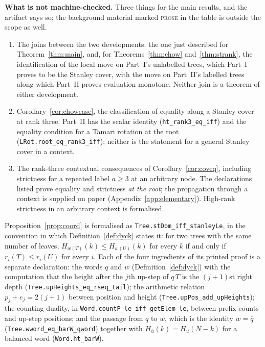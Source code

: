 \documentclass[11pt,a4paper]{article}
\theoremstyle{plain}
\theoremstyle{definition}
\begin{document}
\textbf{What is not machine-checked.}  Three things for the main results, and the
artifact says so; the background material marked \textsc{prose} in the table is outside
the scope as well.
\begin{enumerate}\itemsep2pt
\item The joins between the two developments: the one just described for
      Theorem~\ref{thm:main}, and, for Theorems~\ref{thm:chow} and~\ref{thm:strank},
      the identification of the local move on Part~I's unlabelled trees, which Part~I
      proves to be the Stanley cover, with the move on Part~II's labelled trees along
      which Part~II proves evaluation monotone.  Neither join is a theorem of either
      development.
\item Corollary~\ref{cor:chowcase}, the classification of equality along a Stanley cover
      at rank three.  Part~II has the scalar identity (\verb|ht_rank3_eq_iff|) and the
      equality condition for a Tamari rotation at the root
      (\verb|LRot.root_eq_rank3_iff|); neither is the statement for a general Stanley
      cover in a context.
\item The rank-three contextual consequences of Corollary~\ref{cor:coveq}, including
      strictness for a repeated label $a\ge3$ at an arbitrary node.  The declarations
      listed prove equality and strictness \emph{at the root}; the propagation through a
      context is supplied on paper (Appendix~\ref{app:elementary}).  High-rank
      strictness in an arbitrary context is formalised.
\end{enumerate}


\begin{sloppypar}
Proposition~\ref{prop:coord} is formalised as
\verb|Tree.stDom_iff_stanleyLe|, in the convention in which
Definition~\ref{def:dyck} states it: for two trees with the same number of leaves,
$H_{w(T)}(k)\le H_{w(U)}(k)$ for every $k$ if and only if $r_i(T)\le r_i(U)$ for every
$i$. Each of the four ingredients of its
printed proof is a separate declaration: the words $q$ and $w$
(Definition~\ref{def:dyck}) with the computation that the height after the $j$th up-step
of $q\,T$ is the $(j+1)$st right depth (\verb|Tree.upHeights_eq_rseq_tail|); the
arithmetic relation $p_j+e_j=2(j+1)$ between position and height
(\verb|Tree.upPos_add_upHeights|); the counting duality, in
\verb|Word.countP_le_iff_getElem_le|, between prefix counts and up-step positions;
and the passage from $q$ to
$w$, which is the identity $w=\overline{q}$ (\verb|Tree.wword_eq_barW_qword|) together
with $H_{\bar u}(k)=H_u(N-k)$ for a balanced word (\verb|Word.ht_barW|).
\end{sloppypar}
\end{document}

